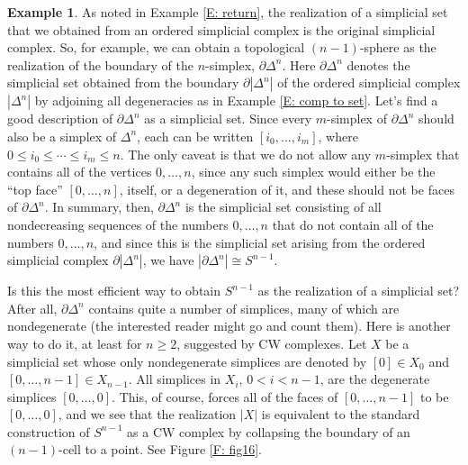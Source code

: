 \documentclass[12pt]{article}
\theoremstyle{plain}
\theoremstyle{definition}
\newtheorem{example}[theorem]{Example}
\newcommand{\bd}{\partial}
\begin{document}
\begin{example}\label{E: sphere}
As noted in Example \ref{E: return}, the realization of a simplicial set that we obtained from an ordered simplicial complex is the original simplicial complex. So, for example, we can obtain a topological $(n-1)$-sphere as the realization of the boundary of the $n$-simplex, $\bd \Delta^n$. Here $\bd \Delta^n$ denotes the simplicial set obtained from the boundary $\bd |\Delta^n|$ of the ordered simplicial complex $|\Delta^n|$ by adjoining all degeneracies as in Example \ref{E: comp to set}. 
Let's find a good description of $\bd \Delta^n$  as a simplicial set. Since every $m$-simplex of $\bd \Delta^n$ should also be a simplex of $\Delta^n$, each can be written $[i_0,\ldots, i_m]$, where $0\leq i_0\leq \cdots\leq i_m\leq n$. The only caveat is that we do not allow any $m$-simplex that contains all of the vertices $0,\ldots, n$, since any such simplex would either be the ``top face'' $[0,\ldots, n]$, itself, or a degeneration of it, and these should not be faces of $\bd \Delta^n$. In summary, then,  $\bd \Delta^n$ is the simplicial set consisting of all nondecreasing sequences of the numbers $0,\ldots,n$ that do not contain all of the numbers $0,\ldots ,n$, and since this is the simplicial set arising from the ordered simplicial complex $\bd |\Delta^n|$, we have $|\bd \Delta^n|\cong S^{n-1}$.

Is this the most efficient way to obtain $S^{n-1}$ as the realization of a simplicial set? After all, $\bd \Delta^n$ contains quite a number of simplices, many of which are nondegenerate (the interested reader might go and count them). Here is another way to do it, at least for $n\geq 2$, suggested by CW complexes. Let $X$ be a simplicial set whose only  nondegenerate simplices are denoted by $[0]\in X_0$ and $[0,\ldots, n-1]\in X_{n-1}$. All simplices in $X_i$, $0<i<n-1$, are the degenerate simplices $[0,\ldots, 0]$. This, of course, forces all of the faces of $[0,\ldots, n-1]$ to be $[0,\ldots, 0]$, and we see that the realization $|X|$  is equivalent to the standard construction of $S^{n-1}$ as a CW complex by collapsing the boundary of an $(n-1)$-cell to a point. See Figure \ref{F: fig16}. 


\end{example}
\end{document}
